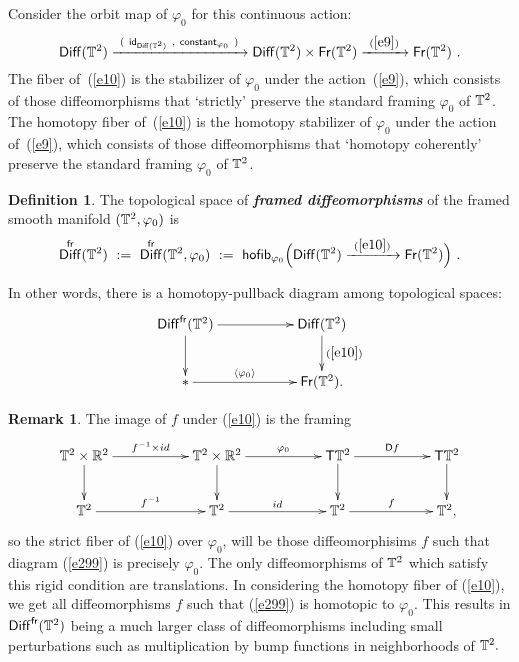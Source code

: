 \documentclass{amsart}
\theoremstyle{definition}
\newtheorem{definition}[theorem]{Definition}
\newtheorem{remark}[theorem]{Remark}
\theoremstyle{remark}
\DeclareMathOperator{\Diff}{{\sf Diff}}
\DeclareMathOperator{\fr}{\sf fr}
\newcommand{\lag}{\langle}
\newcommand{\rag}{\rangle}
\newcommand{\xra}{\xrightarrow}
\DeclareMathOperator{\Fr}{\sf Fr}
\DeclareMathOperator{\id}{\sf id}
\begin{document}
Consider the orbit map of $\varphi_0$ for this continuous action:
\begin{equation}\label{e10}
\Diff(\TT^2)
\xra{~(~\id_{\Diff(\TT^2)}~ ,~ {\sf constant}_{\varphi_0}~)~}
\Diff(\TT^2)\times \Fr(\TT^2)
\xra{~(\ref{e9})~}
\Fr(\TT^2)
~.
\end{equation}
The fiber of~(\ref{e10}) is the stabilizer of $\varphi_0$ under the action~(\ref{e9}), which consists of those diffeomorphisms that `strictly' preserve the standard framing $\varphi_0$ of $\mathbb T^2$.
The homotopy fiber of~(\ref{e10}) is the homotopy stabilizer of $\varphi_0$ under the action of~(\ref{e9}), which consists of those diffeomorphisms that `homotopy coherently' preserve the standard framing $\varphi_0$ of $\mathbb T^2$.
\begin{definition}\label{d1}
The topological space of \textit{\textbf{framed diffeomorphisms}} of the framed smooth manifold $(\mathbb T^2,\varphi_0)$ is
\begin{equation}\label{e11}
\Diff^{\sf fr}(\TT^2)
~:=~
\Diff^{\sf fr}(\TT^2,\varphi_0)
~:=~
{\sf hofib}_{\varphi_0}\Bigl( 
\Diff(\TT^2)
\xra{~(\ref{e10})~}
\Fr(\TT^2)
\Bigr)
~.
\end{equation}
\end{definition}
In other words, there is a homotopy-pullback diagram among topological spaces:
\begin{equation}\label{e13}
\xymatrix{
\Diff^{\fr}(\TT^2) \ar[rr] \ar[d]
&&
\Diff(\TT^2) \ar[d]^-{(\ref{e10})}
\\
\ast \ar[rr]^-{\lag \varphi_0\rag}
&&
\Fr(\TT^2)
.
}
\end{equation}


\begin{remark}\label{r5} 
The image of $f$ under (\ref{e10}) is the framing
\begin{equation}\label{e299}
\xymatrix{
\TT^{2} \times \RR^{2} \ar[d] \ar[rr]^-{f^{-1} \times id} && \TT^{2} \times \RR^{2} \ar[rr]^-{\varphi_{0}} 
\ar[d] && {\sT}\TT^{2} \ar[rr]^-{\sD f} \ar[d] && {\sT}\TT^{2} \ar[d] \\
\TT^{2} \ar[rr]^-{f^{-1}} && \TT^{2}  \ar[rr]^-{id} && \TT^{2} \ar[rr]^-{f} && \TT^{2},}
\end{equation} 
so the strict fiber of (\ref{e10}) over $\varphi_{0}$, will be those diffeomorphisims $f$ such that diagram (\ref{e299}) is precisely $\varphi_{0}.$ The only diffeomorphisms of $\mathbb T^{2}$ which satisfy this rigid condition are translations. In considering the homotopy fiber of (\ref{e10}), we get all diffeomorphisms $f$ such that (\ref{e299}) is homotopic to $\varphi_{0}.$ This results in $\Diff^{\sf fr}(\TT^2)$ being a much larger class of diffeomorphisms including small perturbations such as multiplication by bump functions in neighborhoods of $\mathbb T^{2}.$
\end{remark}
\end{document}
